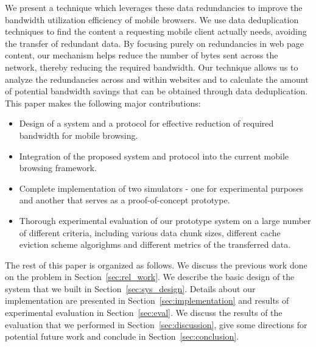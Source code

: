 We present a technique which leverages these data redundancies to improve the bandwidth utilization efficiency of mobile browsers. We use data deduplication 
techniques to find the content a requesting mobile client actually needs, avoiding the transfer of redundant data. By focusing purely on redundancies in web 
page content, our mechanism helps reduce the number of bytes sent across the network, thereby reducing the required bandwidth. Our technique allows us to analyze 
the redundancies across and within websites and to calculate the amount of potential bandwidth savings that can be obtained through data deduplication. This paper 
makes the following major contributions:
\begin{itemize}
\item Design of a system and a protocol for effective reduction of required bandwidth for mobile browsing.
\item Integration of the proposed system and protocol into the current mobile browsing framework.
\item Complete implementation of two simulators - one for experimental purposes and another that serves as a proof-of-concept prototype.
\item Thorough experimental evaluation of our prototype system on a large number of different criteria, including various data chunk sizes, different cache eviction scheme
algorighms and different metrics of the transferred data.
\end{itemize}

The rest of this paper is organized as follows. We discuss the previous work done on the problem in Section~\ref{sec:rel_work}. We describe the basic design of the 
system that we built in Section~\ref{sec:sys_design}. Details about our implementation are presented in Section~\ref{sec:implementation} 
and results of experimental evaluation in Section~\ref{sec:eval}. We discuss the results of the evaluation that we performed in Section~\ref{sec:discussion}, give 
some directions for potential future work and conclude in Section~\ref{sec:conclusion}.
